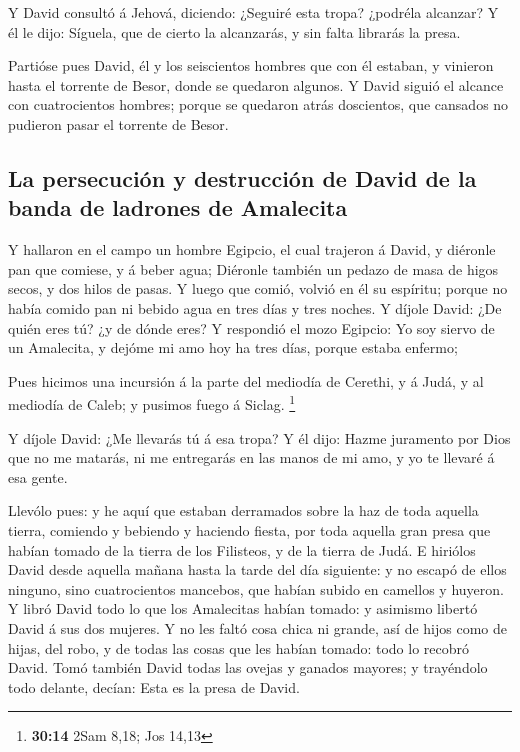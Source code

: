  Y David consultó á Jehová, diciendo: ¿Seguiré esta tropa?
¿podréla alcanzar? Y él le dijo: Síguela, que de cierto la alcanzarás, y
sin falta librarás la presa.

 Partióse pues David, él y los seiscientos hombres que con
él estaban, y vinieron hasta el torrente de Besor, donde se quedaron
algunos.  Y David siguió el alcance con cuatrocientos
hombres; porque se quedaron atrás doscientos, que cansados no pudieron
pasar el torrente de Besor.

\hypertarget{la-persecuciuxf3n-y-destrucciuxf3n-de-david-de-la-banda-de-ladrones-de-amalecita}{%
\subsection{La persecución y destrucción de David de la banda de
ladrones de
Amalecita}\label{la-persecuciuxf3n-y-destrucciuxf3n-de-david-de-la-banda-de-ladrones-de-amalecita}}

 Y hallaron en el campo un hombre Egipcio, el cual trajeron
á David, y diéronle pan que comiese, y á beber agua; 
Diéronle también un pedazo de masa de higos secos, y dos hilos de pasas.
Y luego que comió, volvió en él su espíritu; porque no había comido pan
ni bebido agua en tres días y tres noches.  Y díjole David:
¿De quién eres tú? ¿y de dónde eres? Y respondió el mozo Egipcio: Yo soy
siervo de un Amalecita, y dejóme mi amo hoy ha tres días, porque estaba
enfermo;

 Pues hicimos una incursión á la parte del mediodía de
Cerethi, y á Judá, y al mediodía de Caleb; y pusimos fuego á Siclag.
\footnote{\textbf{30:14} 2Sam 8,18; Jos 14,13}

 Y díjole David: ¿Me llevarás tú á esa tropa? Y él dijo:
Hazme juramento por Dios que no me matarás, ni me entregarás en las
manos de mi amo, y yo te llevaré á esa gente.

 Llevólo pues: y he aquí que estaban derramados sobre la
haz de toda aquella tierra, comiendo y bebiendo y haciendo fiesta, por
toda aquella gran presa que habían tomado de la tierra de los Filisteos,
y de la tierra de Judá.  E hiriólos David desde aquella
mañana hasta la tarde del día siguiente: y no escapó de ellos ninguno,
sino cuatrocientos mancebos, que habían subido en camellos y huyeron.
 Y libró David todo lo que los Amalecitas habían tomado: y
asimismo libertó David á sus dos mujeres.  Y no les faltó
cosa chica ni grande, así de hijos como de hijas, del robo, y de todas
las cosas que les habían tomado: todo lo recobró David. 
Tomó también David todas las ovejas y ganados mayores; y trayéndolo todo
delante, decían: Esta es la presa de David.

